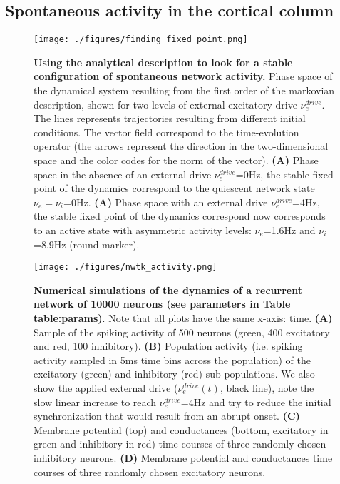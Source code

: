 \documentclass[8pt, colorlinks, a4paper]{article}
\renewcommand\ref{}
\begin{document}
\subsection{Spontaneous activity in the cortical column}
\label{sec-4-4}

\begin{figure*}
\centering
\texttt{[image: ./figures/finding\_fixed\_point.png]}
\caption{\label{fig:phase-space}\textbf{Using the analytical description to look for a stable configuration of spontaneous network activity.} Phase space of the dynamical system resulting from the first order of the markovian description, shown for two levels of external excitatory drive \(\nu_e^{drive}\). The lines represents trajectories resulting from different initial conditions. The vector field correspond to the time-evolution operator (the arrows represent the direction in the two-dimensional space and the color codes for the norm of the vector). \textbf{(A)} Phase space in the absence of an external drive \(\nu_e^{drive}\)=0Hz, the stable fixed point of the dynamics correspond to the quiescent network state \(\nu_e=\nu_i\)=0Hz. \textbf{(A)} Phase space with an external drive \(\nu_e^{drive}\)=4Hz, the stable fixed point of the dynamics correspond now corresponds to an active state with asymmetric activity levels: \(\nu_e\)=1.6Hz and \(\nu_i\)=8.9Hz (round marker).}
\end{figure*}

\begin{figure}[tb!]
\centering
\texttt{[image: ./figures/nwtk\_activity.png]}
\caption{\label{fig:ntwk-act}\textbf{Numerical simulations of the dynamics of a recurrent network of 10000 neurons (see parameters in Table \ref{table:params})}. Note that all plots have the same x-axis: time. \textbf{(A)} Sample of the spiking activity of 500 neurons (green, 400 excitatory and red, 100 inhibitory). \textbf{(B)} Population activity (i.e. spiking activity sampled in 5ms time bins across the population) of the excitatory (green) and inhibitory (red) sub-populations. We also show the applied external drive (\(\nu_e^{drive}(t)\), black line), note the slow linear increase to reach \(\nu_e^{drive}\)=4Hz and try to reduce the initial synchronization that would result from an abrupt onset. \textbf{(C)} Membrane potential (top) and conductances (bottom, excitatory in green and inhibitory in red) time courses of three randomly chosen inhibitory neurons. \textbf{(D)} Membrane potential and conductances time courses of three randomly chosen excitatory neurons.}
\end{figure}
\end{document}
